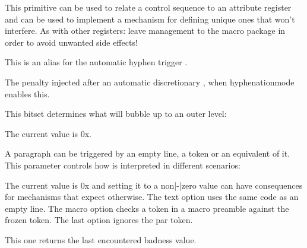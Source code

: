 \stopnewprimitive

\startnewprimitive[title={\prm {attributedef}}]

This primitive can be used to relate a control sequence to an attribute register
and can be used to implement a mechanism for defining unique ones that won't
interfere. As with other registers: leave management to the macro package in
order to avoid unwanted side effects!

\stopnewprimitive

\startnewprimitive[title={\prm {automaticdiscretionary}}]

This is an alias for the automatic hyphen trigger \type {-}.

\stopnewprimitive

\startnewprimitive[title={\prm {automatichyphenpenalty}}]

The penalty injected after an automatic discretionary \type {-}, when \prm
{hyphenationmode} enables this.

\stopnewprimitive

\startnewprimitive[title={\prm {automigrationmode}}]

This bitset determines what will bubble up to an outer level:


The current value is {\tttf 0x\tohexadecimal\automigrationmode}.

\stopnewprimitive

\startnewprimitive[title={\prm {autoparagraphmode}}]

A paragraph can be triggered by an empty line, a \type {\par} token or an
equivalent of it. This parameter controls how \type {\par} is interpreted in
different scenarios:


The current value is {\tttf 0x\tohexadecimal\autoparagraphmode} and setting it to
a non|-|zero value can have consequences for mechanisms that expect otherwise.
The text option uses the same code as an empty line. The macro option checks a
token in a macro preamble against the frozen  token. The last option
ignores the par token.

\stopnewprimitive

\startoldprimitive[title={\prm {badness}}]

This one returns the last encountered badness value.

